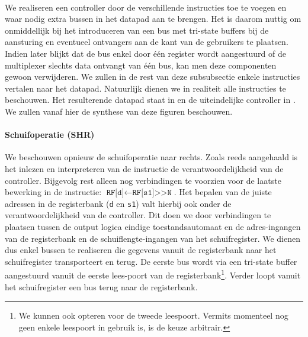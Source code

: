 \paragraph{}
We realiseren een controller door de verschillende instructies toe te voegen en waar nodig extra bussen in het datapad aan te brengen. Het is daarom nuttig om onmiddellijk bij het introduceren van een bus met tri-state buffers bij de aansturing en eventueel ontvangers aan de kant van de gebruikers te plaatsen. Indien later blijkt dat de bus enkel door \'e\'en register wordt aangestuurd of de multiplexer slechts data ontvangt van \'e\'en bus, kan men deze componenten gewoon verwijderen. We zullen in de rest van deze subsubsectie enkele instructies vertalen naar het datapad. Natuurlijk dienen we in realiteit alle instructies te beschouwen. Het resulterende datapad staat in  en de uiteindelijke controller in . We zullen vanaf hier de synthese van deze figuren beschouwen.
\paragraph{Schuifoperatie (SHR)}
We beschouwen opnieuw de schuifoperatie naar rechts. Zoals reeds aangehaald is het inlezen en interpreteren van de instructie de verantwoordelijkheid van de controller. Bijgevolg rest alleen nog verbindingen te voorzien voor de laatste bewerking in de instructie: $\texttt{RF[d]}\leftarrow\texttt{RF[s1]>{}>N}$. Het bepalen van de juiste adressen in de registerbank (\texttt{d} en \texttt{s1}) valt hierbij ook onder de verantwoordelijkheid van de controller. Dit doen we door verbindingen te plaatsen tussen de output logica eindige toestandsautomaat en de adres-ingangen van de registerbank en de schuiflengte-ingangen van het schuifregister. We dienen dus enkel bussen te realiseren die gegevens vanuit de registerbank naar het schuifregister transporteert en terug. De eerste bus wordt via een tri-state buffer aangestuurd vanuit de eerste lees-poort van de registerbank\footnote{We kunnen ook opteren voor de tweede leespoort. Vermits momenteel nog geen enkele leespoort in gebruik is, is de keuze arbitrair.}. Verder loopt vanuit het schuifregister een bus terug naar de registerbank.
